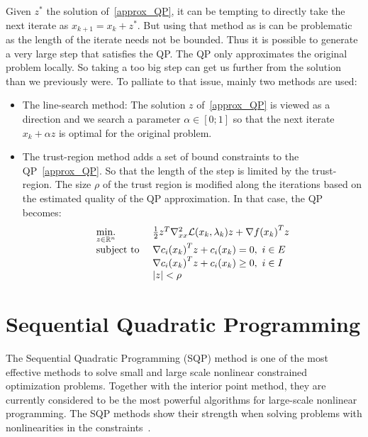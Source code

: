 Given $z^*$ the solution of~\ref{approx_QP}, it can be tempting to directly take the next iterate as $x_{k+1} = x_k + z^*$.
But using that method as is can be problematic as the length of the iterate needs not be bounded.
Thus it is possible to generate a very large step that satisfies the QP\@.
The QP only approximates the original problem locally.
So taking a too big step can get us further from the solution than we previously were.
To palliate to that issue, mainly two methods are used:
\begin{itemize}
  \item The line-search method: The solution $z$ of~\ref{approx_QP} is viewed as a direction and we search a parameter $\alpha\in [0;1]$ so that the next iterate $x_k + \alpha z$ is optimal for the original problem.
  \item The trust-region method adds a set of bound constraints to the QP~\ref{approx_QP}. So that the length of the step is limited by the trust-region. The size $\rho$ of the trust region is modified along the iterations based on the estimated quality of the QP approximation. In that case, the QP becomes:
\begin{equation}
  \begin{array}{ll}
    \operatorname*{min.}\limits_{z\in \mathbb{R}^n}{} & \frac{1}{2}z^T \nabla_{xx}^2 \mathcal{L}(x_k, \lambda_k)z + {\nabla f(x_k)}^T z \\
    \text{subject to } & {\nabla c_i(x_k)}^T z+c_i(x_k)=0,\ i\in E \\
                       & {\nabla c_i(x_k)}^T z+c_i(x_k)\geq 0,\ i\in I\\
                       & |z|<\rho
  \end{array}
\end{equation}
\end{itemize}

\section{Sequential Quadratic Programming}
\label{sec:sequential_quadratic_programming}

The Sequential Quadratic Programming (SQP) method is one of the most effective methods to solve small and large scale nonlinear constrained optimization problems.
Together with the interior point method, they are currently considered to be the most powerful algorithms for large-scale nonlinear programming.
The SQP methods show their strength when solving problems with nonlinearities in the constraints~\cite{nocedal:book:2006}.

